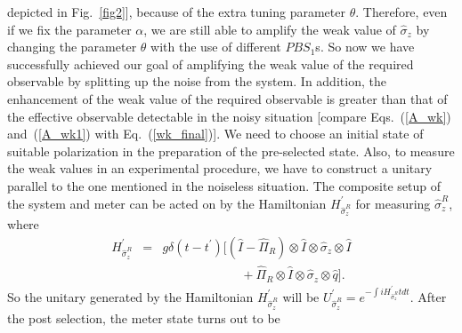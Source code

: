 \documentclass[aps,pra,showpacs,twoside,twocolumn,10pt]{revtex4-1}
\begin{document}
depicted
in Fig.~\ref{fig2}], because %
of the 
extra tuning parameter $\theta$. Therefore, even if we fix the parameter $\alpha$, we are still able to amplify the weak value of $\hat{\sigma}_z$ by changing the parameter $\theta$ with the use of different $PBS_1$s. So now we have successfully achieved our goal of amplifying the weak value of the required observable by splitting up the noise from the system. In addition, the enhancement of the weak value of the required observable is
greater than that of the effective observable detectable in the noisy situation [compare Eqs.~(\ref{A_wk}) and~(\ref{A_wk1}) with Eq.~(\ref{wk_final})]. %
We need to choose 
an initial state of suitable polarization in the preparation of the pre-selected state. Also, to measure the weak values in an experimental procedure, we have to construct a unitary parallel to the one mentioned in the noiseless situation. 
The composite setup of the system and meter can be acted on by the Hamiltonian $H_{\hat{\sigma}_z^R}^{\prime}$ for measuring $\hat{\sigma}_z^R$, where
\begin{eqnarray}
H_{\hat{\sigma}_z^R}^{\prime} &=& g\delta(t-t^{\prime})[(\hat{I}-\hat{\Pi}_R) \otimes \hat{I} \otimes \hat{\sigma}_z \otimes \hat{I}\nonumber\\
&&\phantom{na go ei je dhula}+\hat{\Pi}_R \otimes \hat{I}\otimes\hat{\sigma}_z \otimes \hat{q}]. \label{eq:H_sigma}
\end{eqnarray} 
So the unitary generated by the Hamiltonian $H_{\hat{\sigma}_z^R}^{\prime}$ will be $U_{\hat{\sigma}_z^R}^{\prime}=e^{-\int iH_{\hat{\sigma}_z^R}^{\prime}t dt}$. After the post selection, the meter state turns out to be
\end{document}
